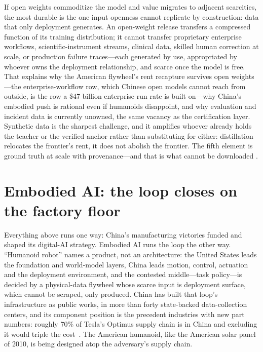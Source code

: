 If open weights commoditize the model and value migrates to adjacent scarcities, the most durable is the one input openness cannot replicate by construction: data that only deployment generates. An open-weight release transfers a compressed function of its training distribution; it cannot transfer proprietary enterprise workflows, scientific-instrument streams, clinical data, skilled human correction at scale, or production failure traces---each generated by use, appropriated by whoever owns the deployment relationship, and scarce once the model is free. That explains why the American flywheel's rent recapture survives open weights---the enterprise-workflow row, which Chinese open models cannot reach from outside, is the row a \$47 billion enterprise run rate is built on---why China's embodied push is rational even if humanoids disappoint, and why evaluation and incident data is currently unowned, the same vacancy as the certification layer. Synthetic data is the sharpest challenge, and it amplifies whoever already holds the teacher or the verified anchor rather than substituting for either: distillation relocates the frontier's rent, it does not abolish the frontier. The fifth element is ground truth at scale with provenance---and that is what cannot be downloaded .

\section{Embodied AI: the loop closes on the factory floor}
\label{c:embodied}

Everything above runs one way: China's manufacturing victories funded and shaped its digital-AI strategy. Embodied AI runs the loop the other way. ``Humanoid robot'' names a product, not an architecture: the United States leads the foundation and world-model layers, China leads motion, control, actuation and the deployment environment, and the contested middle---task policy---is decided by a physical-data flywheel whose scarce input is deployment surface, which cannot be scraped, only produced. China has built that loop's infrastructure as public works, in more than forty state-backed data-collection centers, and its component position is the precedent industries with new part numbers: roughly 70\% of Tesla's Optimus supply chain is in China and excluding it would triple the cost~\cite{optimus-china}. The American humanoid, like the American solar panel of 2010, is being designed atop the adversary's supply chain.

